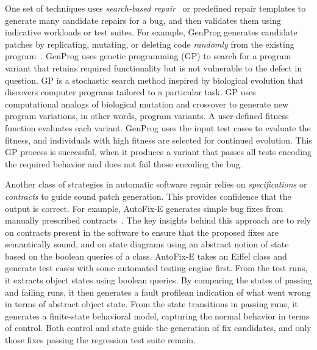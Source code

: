 One set of techniques uses {\em search-based repair}~\cite{harman07} or predefined repair templates to generate many candidate repairs for a bug, and then validates them using indicative workloads or test suites. For example, GenProg generates candidate patches by replicating, mutating, or deleting code \emph{randomly} from the existing program~\cite{genprog-icse2012, Weimer2009:AFP}. GenProg uses genetic programming (GP) to search for a program variant that retains required functionality but is not vulnerable to the defect in question. GP is a stochastic search method inspired by biological evolution that discovers computer programs tailored to a particular task. GP uses computational analogs of biological mutation and crossover to generate new program variations, in other words, program variants. A user-defined fitness function evaluates each variant. GenProg uses the input test cases to evaluate the fitness, and individuals with high fitness are selected for continued evolution. This GP process is successful, when it produces a variant that passes all tests encoding the required behavior and does not fail those encoding the bug.


Another class of strategies in automatic software repair relies on {\em specifications} or {\em contracts} to guide sound patch generation. %
This provides confidence that the output is correct. For example, AutoFix-E generates simple bug fixes from manually prescribed contracts~\cite{Wei:2010:AutoFix-E}. The key insights behind this approach are to rely on contracts present in the software to ensure that the proposed fixes are semantically sound, and on state diagrams using an abstract notion of state based on the boolean queries of a class. AutoFix-E takes an Eiffel class and generate test cases with some automated testing engine first. From the test runs, it extracts object states using boolean queries. By comparing the states of passing and failing runs, it then generates a fault profile\textemdash an indication of what went wrong in terms of abstract object state. From the state transitions in passing runs, it generates a finite-state behavioral model, capturing the normal behavior in terms of control. Both control and state guide the generation of fix candidates, and only those fixes passing the regression test suite remain. 

